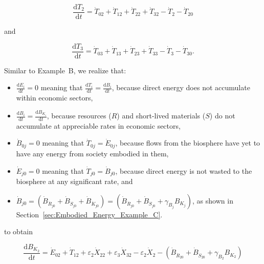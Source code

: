 \begin{equation} \label{eq:C-Total_Energy_Sec_2-a}
	\frac{\mathrm{d}T_{2}}{\mathrm{d}t} 
	= \dot{T}_{02}  
	+ \dot{T}_{12}
	+ \dot{T}_{22}
	+ \dot{T}_{32}
	- \dot{T}_{2}
	- \dot{T}_{20}
\end{equation}

\noindent{}and

\begin{equation} \label{eq:C-Total_Energy_Sec_3-a}
	\frac{\mathrm{d}T_{3}}{\mathrm{d}t} 
	= \dot{T}_{03}  
	+ \dot{T}_{13}
	+ \dot{T}_{23}
	+ \dot{T}_{33}
	- \dot{T}_{3}
	- \dot{T}_{30}.
\end{equation}

\noindent{}Similar to Example~B, we realize that: 

\begin{itemize}
	\item{$\frac{\mathrm{d}E_i}{\mathrm{d}t} = 0$
		meaning that
		$\frac{\mathrm{d}T_i}{\mathrm{d}t} = \frac{\mathrm{d}B_i}{\mathrm{d}t}$, 
		because direct energy
		does not accumulate within economic sectors,}
	\item{$\frac{\mathrm{d}B_i}{\mathrm{d}t} = \frac{\mathrm{d}B_{K_{i}}}{\mathrm{d}t}$,
		because resources ($R$) and short-lived materials ($S$) do not 
		accumulate at appreciable rates in economic sectors,}
	\item{$\dot{B}_{0j} = 0$ meaning that $\dot{T}_{0j} = \dot{E}_{0j}$,
		because flows from the biosphere have yet to have any energy from society embodied in them,
		}
	\item{$\dot{E}_{j0} = 0$ meaning that $\dot{T}_{j0} = \dot{B}_{j0}$, 
	because direct energy is not wasted to the biosphere at any significant rate, and} 
	\item{$\dot{B}_{j0} = \left( \dot{B}_{\dot{R}_{j0}} 
							+ \dot{B}_{\dot{S}_{j0}}
							+ \dot{B}_{\dot{K}_{j0}}
							\right)
						= \left( \dot{B}_{\dot{R}_{j0}} 
							+ \dot{B}_{\dot{S}_{j0}}
							+ \gamma_{B_{j}} B_{K_{j}}
							\right)$, as shown in Section~\ref{sec:Embodied_Energy_Example_C}.}
\end{itemize}

\noindent{}to obtain

\begin{equation} \label{eq:C-Total_Energy_Sec_2-b}
	\frac{\mathrm{d}B_{K_{2}}}{\mathrm{d}t}
	= \dot{E}_{02}
	+ \dot{T}_{12}
	+ \varepsilon_{2} \dot{X}_{22}
	+ \varepsilon_{3} \dot{X}_{32}
	- \varepsilon_{2} \dot{X}_{2}
	- \left( \dot{B}_{\dot{R}_{20}} 
							+ \dot{B}_{\dot{S}_{20}}
							+ \gamma_{B_{2}} B_{K_{2}}
							\right)
\end{equation}

